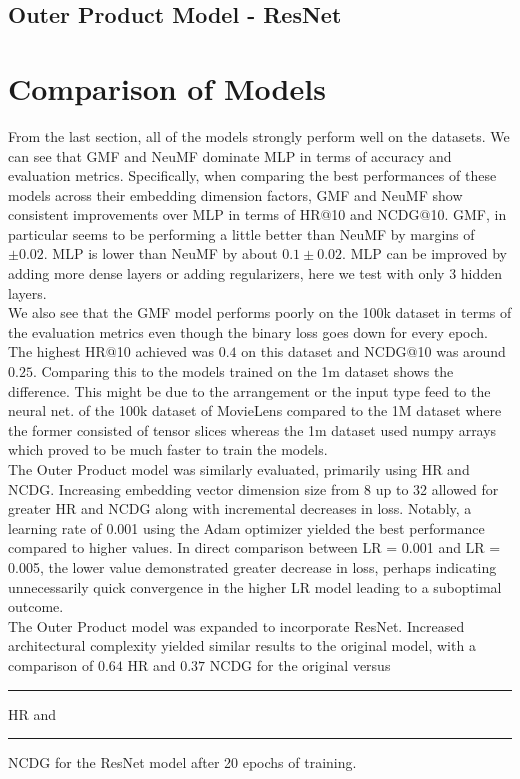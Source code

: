 \documentclass{article}
\begin{document}
\subsection{Outer Product Model - ResNet}


\section{Comparison of Models}
From the last section, all of the models strongly perform well on the datasets. We can see that GMF and NeuMF dominate MLP in terms of accuracy and evaluation metrics. Specifically, when comparing the best performances of these models across their embedding dimension factors, GMF and NeuMF show consistent improvements over MLP in terms of HR@10 and NCDG@10. GMF, in particular seems to be performing a little better than NeuMF by margins of $\pm 0.02$. MLP is lower than NeuMF by about $0.1 \pm 0.02$. MLP can be improved by adding more dense layers or adding regularizers, here we test with only 3 hidden layers.\\

We also see that the GMF model performs poorly on the 100k dataset in terms of the evaluation metrics even though the binary loss goes down for every epoch. The highest HR@10 achieved was $0.4$ on this dataset and NCDG@10 was around $0.25$. Comparing this to the models trained on the 1m dataset shows the difference. This might be due to the arrangement or the input type feed to the neural net. of the 100k dataset of MovieLens compared to the 1M dataset where the former consisted of tensor slices whereas the 1m dataset used numpy arrays which proved to be much faster to train the models.\\

The Outer Product model was similarly evaluated, primarily using HR and NCDG. Increasing embedding vector dimension size from 8 up to 32 allowed for greater HR and NCDG along with incremental decreases in loss. Notably, a learning rate of 0.001 using the Adam optimizer yielded the best performance compared to higher values. In direct comparison between LR = 0.001 and LR = 0.005, the lower value demonstrated greater decrease in loss, perhaps indicating unnecessarily quick convergence in the higher LR model leading to a suboptimal outcome.\\

The Outer Product model was expanded to incorporate ResNet. Increased architectural complexity yielded similar results to the original model, with a comparison of $0.64$ HR and $0.37$ NCDG for the original versus \rule{1cm}{0.15mm} HR and \rule{1cm}{0.15mm} NCDG for the ResNet model after 20 epochs of training.\\
\end{document}
